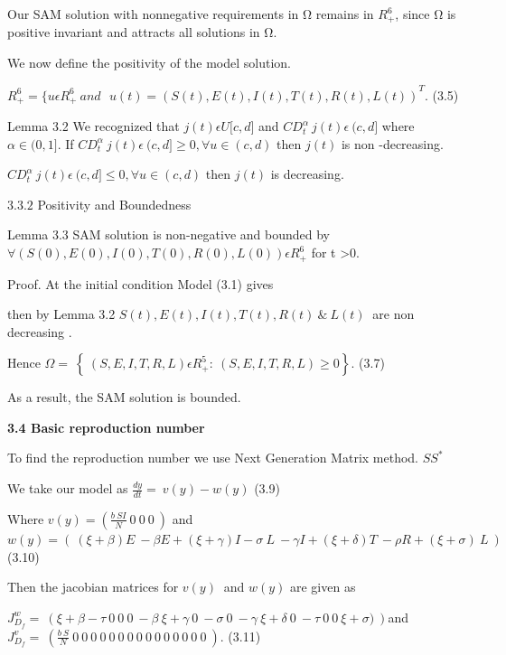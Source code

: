 \documentclass[10pt]{NSP1}
\begin{document}
Our SAM solution with nonnegative requirements in Ω remains in $R_{+}^{6}$, since Ω is positive invariant and attracts all solutions in Ω.

We now define the positivity of the model solution.

$R_{+}^{6} = {\{ u\epsilon R_{+}^{6}\ and\ \ \ u(t) = (S(t),E(t),I(t),T(t),R(t),L(t))}^{T}.$ (3.5)

Lemma 3.2 We recognized that $j(t)\epsilon U\lbrack c,d\rbrack$ and $CD_{t}^{\alpha}\ j(t)\epsilon\ (c,d\rbrack$ where $\alpha \in (0,1\rbrack$. If $CD_{t}^{\alpha}\ j(t)\epsilon\ (c,d\rbrack \geq 0,\forall u \in (c,d)$ then $j(t)$ is non -decreasing.

$CD_{t}^{\alpha}\ j(t)\epsilon\ (c,d\rbrack \leq 0,\forall u \in (c,d)$ then $j(t)$ is decreasing.

3$\mathbf{.3.2}$ Positivity and Boundedness

Lemma 3.3 SAM solution is non-negative and bounded by $\forall(S(0),E(0),I(0),T(0),R(0),L(0))\epsilon R_{+}^{6}$ for t \textgreater{}0.

Proof. At the initial condition Model (3.1) gives

then by Lemma 3.2 $S(t),E(t),I(t),T(t),R(t)\ \&\ L(t)\ $ are non decreasing .

Hence $\Omega = \ \left\{ \ (S,E,I,T,R,L)\epsilon R_{+}^{5}:\ (S,E,I,T,R,L) \geq 0 \right\}.$ (3.7)

As a result, the SAM solution is bounded.

\par\vspace{14.0pt}\noindent \begin{center}\large\bfseries 3.4 Basic reproduction number\end{center}\vspace{14.0pt}

To find the reproduction number we use Next Generation Matrix method. $SS^{\ast}$

We take our model as $\frac{dy}{dt} = \ v(y) - w(y)$ (3.9)

Where $v(y) = \left( \frac{b\ SI}{N}\ 0\ 0\ 0\  \right)$ and $w(y) = \left( \ (\xi + \beta)E\  - \beta E + (\xi + \gamma)I - \sigma\ L\  - \gamma I + (\xi + \delta)T\  - \rho R + (\xi + \sigma)\ L\  \right)$ (3.10)

Then the jacobian matrices for $v(y)\ $ and $w(y)$ are given as

$J_{D_{f}}^{w} = \ \left( \xi + \beta - \tau\ 0\ 0\ 0\  - \beta\ \xi + \gamma\ 0\  - \sigma\ 0\  - \gamma\ \xi + \delta\ 0\  - \tau\ 0\ 0\ \xi + \sigma)\  \right)$and $J_{D_{f}}^{v} = \ \left( \frac{b\ S}{N}\ 0\ 0\ 0\ 0\ 0\ 0\ 0\ 0\ 0\ 0\ 0\ 0\ 0\ 0\ 0\  \right)$. (3.11)
\end{document}
